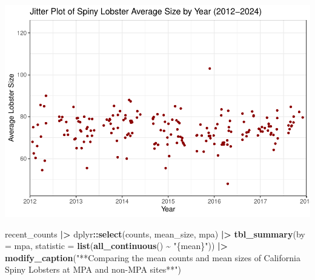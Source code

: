\documentclass[
]{article}
\newenvironment{Shaded}{\begin{snugshade}}{\end{snugshade}}
\newcommand{\AttributeTok}[1]{\textcolor[rgb]{0.13,0.29,0.53}{#1}}
\newcommand{\FunctionTok}[1]{\textcolor[rgb]{0.13,0.29,0.53}{\textbf{#1}}}
\newcommand{\NormalTok}[1]{#1}
\newcommand{\SpecialCharTok}[1]{\textcolor[rgb]{0.81,0.36,0.00}{\textbf{#1}}}
\newcommand{\StringTok}[1]{\textcolor[rgb]{0.31,0.60,0.02}{#1}}
\begin{document}
\includegraphics{hw1-lobstrs-eds241_files/figure-latex/unnamed-chunk-28-4.pdf}

\begin{Shaded}
\begin{Highlighting}[]
\NormalTok{recent\_counts }\SpecialCharTok{|\textgreater{}} 
\NormalTok{    dplyr}\SpecialCharTok{::}\FunctionTok{select}\NormalTok{(counts, mean\_size, mpa) }\SpecialCharTok{|\textgreater{}}
    \FunctionTok{tbl\_summary}\NormalTok{(}\AttributeTok{by =}\NormalTok{ mpa,}
                \AttributeTok{statistic =} \FunctionTok{list}\NormalTok{(}\FunctionTok{all\_continuous}\NormalTok{() }\SpecialCharTok{\textasciitilde{}} \StringTok{"\{mean\}"}\NormalTok{)) }\SpecialCharTok{|\textgreater{}}
    \FunctionTok{modify\_caption}\NormalTok{(}\StringTok{"**Comparing the mean counts and mean sizes of California Spiny Lobsters at MPA and non{-}MPA sites**"}\NormalTok{)}
\end{Highlighting}
\end{Shaded}
\end{document}
